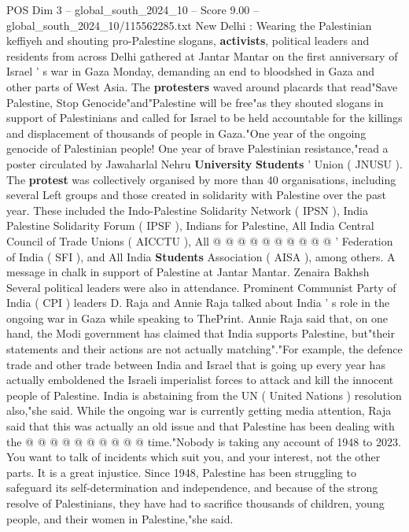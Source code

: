 \begin{textsample}{POS Dim 3 – global\_south\_2024\_10 – Score 9.00 – global\_south\_2024\_10/115562285.txt}  \label{ex:f3_pos_401}
New Delhi : Wearing the Palestinian keffiyeh and shouting pro-Palestine slogans, \textbf{activists}, political leaders and residents from across Delhi gathered at Jantar Mantar on the first anniversary of Israel ' s war in Gaza Monday, demanding an end to bloodshed in Gaza and other parts of West Asia.
The \textbf{protesters} waved around placards that read"Save Palestine, Stop Genocide"and"Palestine will be free"as they shouted slogans in support of Palestinians and called for Israel to be held accountable for the killings and displacement of thousands of people in Gaza."One year of the ongoing genocide of Palestinian people!
One year of brave Palestinian resistance,"read a poster circulated by Jawaharlal Nehru \textbf{University} \textbf{Students} ' Union ( JNUSU ).
The \textbf{protest} was collectively organised by more than 40 organisations, including several Left groups and those created in solidarity with Palestine over the past year.
These included the Indo-Palestine Solidarity Network ( IPSN ), India Palestine Solidarity Forum ( IPSF ), Indians for Palestine, All India Central Council of Trade Unions ( AICCTU ), All @ @ @ @ @ @ @ @ @ @ ' Federation of India ( SFI ), and All India \textbf{Students} Association ( AISA ), among others.
A message in chalk in support of Palestine at Jantar Mantar.
Zenaira Bakhsh Several political leaders were also in attendance.
Prominent Communist Party of India ( CPI ) leaders D.
Raja and Annie Raja talked about India ' s role in the ongoing war in Gaza while speaking to ThePrint.
Annie Raja said that, on one hand, the Modi government has claimed that India supports Palestine, but"their statements and their actions are not actually matching"."For example, the defence trade and other trade between India and Israel that is going up every year has actually emboldened the Israeli imperialist forces to attack and kill the innocent people of Palestine.
India is abstaining from the UN ( United Nations ) resolution also,"she said.
While the ongoing war is currently getting media attention, Raja said that this was actually an old issue and that Palestine has been dealing with the @ @ @ @ @ @ @ @ @ @ time."Nobody is taking any account of 1948 to 2023.
You want to talk of incidents which suit you, and your interest, not the other parts.
It is a great injustice.
Since 1948, Palestine has been struggling to safeguard its self-determination and independence, and because of the strong resolve of Palestinians, they have had to sacrifice thousands of children, young people, and their women in Palestine,"she said.

\end{textsample}

